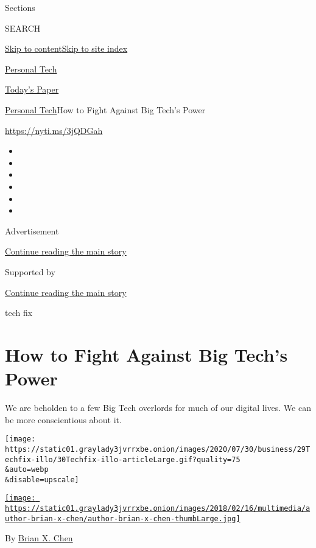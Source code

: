 Sections

SEARCH

\protect\hyperlink{site-content}{Skip to
content}\protect\hyperlink{site-index}{Skip to site index}

\href{https://www.nytimes3xbfgragh.onion/section/technology/personaltech}{Personal
Tech}

\href{https://myaccount.nytimes3xbfgragh.onion/auth/login?response_type=cookie\&client_id=vi}{}

\href{https://www.nytimes3xbfgragh.onion/section/todayspaper}{Today's
Paper}

\href{/section/technology/personaltech}{Personal Tech}\textbar{}How to
Fight Against Big Tech's Power

\url{https://nyti.ms/3jQDGah}

\begin{itemize}
\item
\item
\item
\item
\item
\item
\end{itemize}

Advertisement

\protect\hyperlink{after-top}{Continue reading the main story}

Supported by

\protect\hyperlink{after-sponsor}{Continue reading the main story}

tech fix

\hypertarget{how-to-fight-against-big-techs-power}{%
\section{How to Fight Against Big Tech's
Power}\label{how-to-fight-against-big-techs-power}}

We are beholden to a few Big Tech overlords for much of our digital
lives. We can be more conscientious about it.

\texttt{[image: https://static01.graylady3jvrrxbe.onion/images/2020/07/30/business/29Techfix-illo/30Techfix-illo-articleLarge.gif?quality=75\\\&auto=webp\\\&disable=upscale]}

\href{https://www.nytimes3xbfgragh.onion/by/brian-x-chen}{\texttt{[image: https://static01.graylady3jvrrxbe.onion/images/2018/02/16/multimedia/author-brian-x-chen/author-brian-x-chen-thumbLarge.jpg]}}

By \href{https://www.nytimes3xbfgragh.onion/by/brian-x-chen}{Brian X.
Chen}

